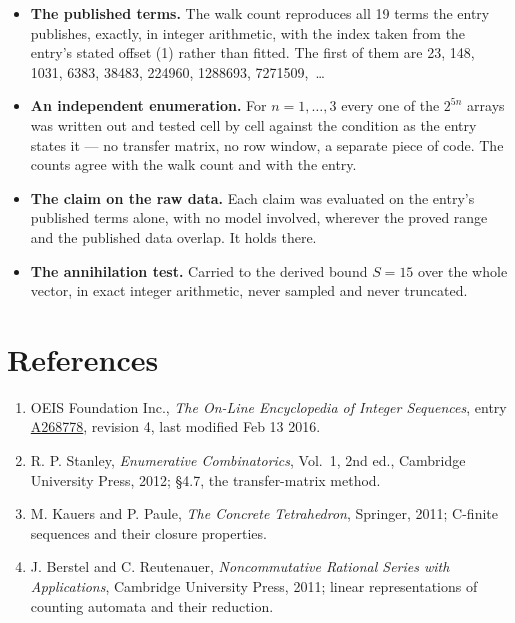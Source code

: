 \documentclass[11pt]{article}
\theoremstyle{definition}
\begin{document}
\begin{itemize}

\item {\bfseries The published terms.} The walk count reproduces all 19 terms the entry publishes, exactly, in integer arithmetic, with the index taken from the entry's stated offset (1) rather than fitted. The first of them are 23, 148, 1031, 6383, 38483, 224960, 1288693, 7271509,~\dots

\item {\bfseries An independent enumeration.} For $n = 1,\dots,3$ every one of the $2^{5n}$ arrays was written out and tested cell by cell against the condition as the entry states it --- no transfer matrix, no row window, a separate piece of code. The counts agree with the walk count and with the entry.

\item {\bfseries The claim on the raw data.} Each claim was evaluated on the entry's published terms alone, with no model involved, wherever the proved range and the published data overlap. It holds there.

\item {\bfseries The annihilation test.} Carried to the derived bound $S = 15$ over the whole vector, in exact integer arithmetic, never sampled and never truncated.

\end{itemize}

\section{References}

\begin{enumerate}

\item OEIS Foundation Inc., \emph{The On-Line Encyclopedia of Integer Sequences}, entry \href{https://oeis.org/A268778}{A268778}, revision 4, last modified Feb 13 2016.

\item R. P. Stanley, \emph{Enumerative Combinatorics}, Vol.~1, 2nd ed., Cambridge University Press, 2012; \S4.7, the transfer-matrix method.

\item M. Kauers and P. Paule, \emph{The Concrete Tetrahedron}, Springer, 2011; C-finite sequences and their closure properties.

\item J. Berstel and C. Reutenauer, \emph{Noncommutative Rational Series with Applications}, Cambridge University Press, 2011; linear representations of counting automata and their reduction.

\end{enumerate}
\end{document}
